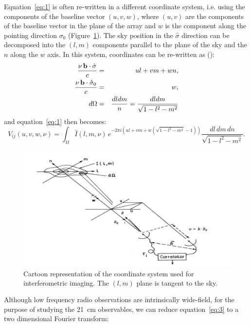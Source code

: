 Equation~\ref{eq:1} is often re-written in a different coordinate system, i.e. using the components of the baseline vector $(u,v,w)$, where $(u,v)$ are the components of the baseline vector in the plane of the array and $w$ is the component along the pointing direction $\sigma_0$ (Figure~\ref{fig:fig1b}). The sky position in the $\hat {\sigma}$ direction can be decomposed into the $(l,m)$ components parallel to the plane of the sky and the $n$ along the $w$ axis. In this system, coordinates can be re-written as (\cite{TMS}):
\begin{eqnarray}
\frac{\nu \, {\bf b} \cdot {\hat {\bf \sigma}}}{c} & = & ul + vm + wn, \nonumber \\
\frac{\nu \, {\bf b} \cdot {\hat {\bf \sigma}}_0}{c} & = & w, \nonumber \\
d\Omega & = & \frac{dl dm}{n} = \frac{dl dm}{\sqrt{1 - l^2 - m^2}}
\label{eq:2.1}
\end{eqnarray}
and equation~\ref{eq:1} then becomes:
\begin{equation}
V_{ij} (u,v,w, \nu) = \int_\Omega {\bar I} (l, m, \nu) \, e^{-2 \pi i (ul + vm + w(\sqrt{1 - l^2 - m^2} - 1))} \frac {dl \, dm \, dn}{\sqrt{1 - l^2 - m^2}}.
\label{eq:3}
\end{equation}
%
\begin{figure}[]
\begin{center}
\includegraphics[width=1.\textwidth]{Bernardi/coordinates_imaging}
\end{center}
\caption{Cartoon representation of the coordinate system used for interferometric imaging. The $(l,m)$ plane is tangent to the sky.}
\label{fig:fig1b}
\end{figure}
%
Although low frequency radio observations are intrinsically wide-field, for the purpose of studying the 21~cm observables, we can reduce equation~\ref{eq:3} to a two dimensional Fourier transform:
